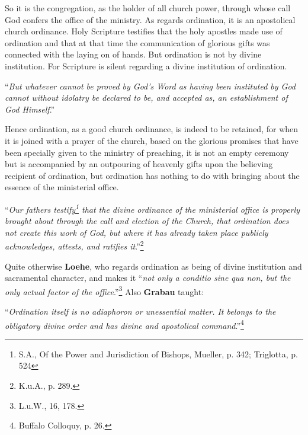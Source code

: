                 So it is the congregation, as the holder of all church power, through whose call God confers the office of the ministry.  As regards ordination, it is an apostolical church ordinance.   Holy Scripture testifies that the holy apostles made use of ordination and that at that time the communication of glorious gifts was connected with the laying on of hands.  But ordination is not by divine institution.  For Scripture is silent regarding a divine institution of ordination.  \begin{displayquote}“\textit{But whatever cannot be proved by God’s Word as having been instituted by God cannot without idolatry be declared to be, and accepted as, an establishment of God Himself}.”\end{displayquote}  Hence ordination, as a good church ordinance, is indeed to be retained, for when it is joined with a prayer of the church, based on the glorious promises that have been specially given to the ministry of preaching, it is not an empty ceremony but is accompanied by an outpouring of heavenly gifts upon the believing recipient of ordination, but ordination has nothing to do with bringing about the essence of the ministerial office.  \begin{displayquote}“\textit{Our fathers testify\footnote{S.A., Of the Power and Jurisdiction of Bishops, Mueller, p. 342; Triglotta, p. 524} that the divine ordinance of the ministerial office is properly brought about through the call and election of the Church, that ordination does not create this work of God, but where it has already taken place publicly acknowledges, attests, and ratifies it}.”\footnote{K.u.A., p. 289.}\end{displayquote}  Quite otherwise \textbf{Loehe}, who regards ordination as being of divine institution and sacramental character, and makes it “\textit{not only a conditio sine qua non, but the only actual factor of the office}.”\footnote{L.u.W., 16, 178.} Also \textbf{Grabau} taught: \begin{displayquote}“\textit{Ordination itself is no adiaphoron or unessential matter.  It belongs to the obligatory divine order and has divine and apostolical command}.”\footnote{Buffalo Colloquy, p. 26.}\end{displayquote}

